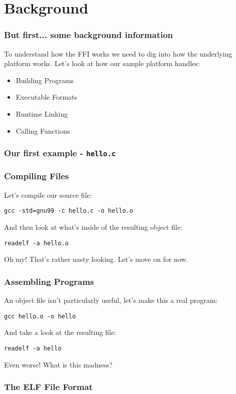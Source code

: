 \documentclass{beamer}
\begin{document}
\section{Background}
\begin{frame}
    \frametitle{But first... some background information}

    To understand how the FFI works we need to dig into how the underlying
    platform works.  Let's look at how our sample platform handles:

    \begin{itemize}
        \item {Building Programs}
        \item {Executable Formats}
        \item {Runtime Linking}
        \item {Calling Functions}
    \end{itemize}
\end{frame}

\begin{frame}
    \frametitle {Our first example - {\tt hello.c}}
    
\end{frame}

\begin{frame}
    \frametitle{Compiling Files}

    Let's compile our source file:

    {\tt gcc -std=gnu99 -c hello.c -o hello.o}

    And then look at what's inside of the resulting object file:

    {\tt readelf -a hello.o}

    Oh my! That's rather nasty looking.  Let's move on for now.
\end{frame}

\begin{frame}
    \frametitle{Assembling Programs}

    An object file isn't particularly useful, let's make this a real program:

    {\tt gcc hello.o -o hello}

    And take a look at the resulting file:

    {\tt readelf -a hello}

    Even worse!  What is this madness?
\end{frame}

\begin{frame}
    \frametitle{The ELF File Format}

\end{frame}
\end{document}
